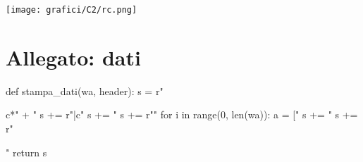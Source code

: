 \begin{center}
\texttt{[image: grafici/C2/rc.png]} 
\end{center}


\section{Allegato: dati}
\begin{sagesilent}
def stampa_dati(wa, header):
  s = r"\begin{tabular}{c*{" + "%
  s += r"}{|c}}"
  s += "%
  s += r"\midrule"
  for i in range(0, len(wa)):
    a = ["%
    s += "%
  s += r"\end{tabular}"
  return s
\end{sagesilent}

\begin{center}

\end{center}

